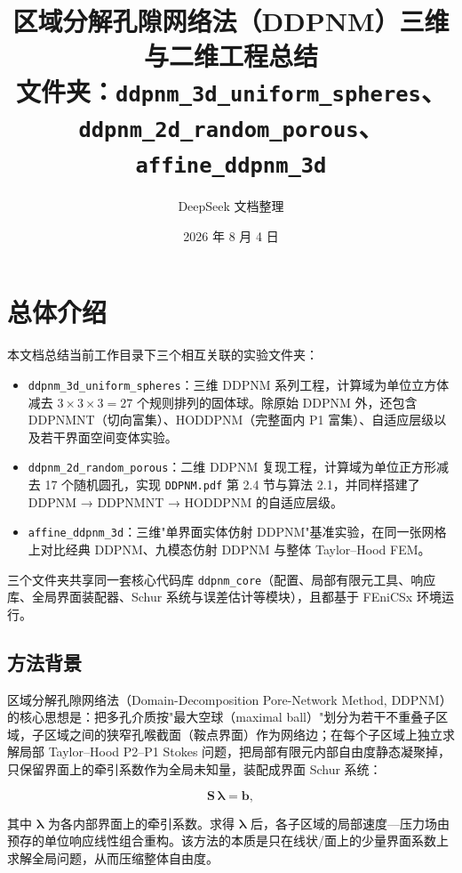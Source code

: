 \documentclass[11pt,a4paper]{ctexart}
\title{\bfseries 区域分解孔隙网络法（DDPNM）三维与二维工程总结\\
\large 文件夹：\texttt{ddpnm\_3d\_uniform\_spheres}、\texttt{ddpnm\_2d\_random\_porous}、\texttt{affine\_ddpnm\_3d}}
\author{DeepSeek 文档整理}
\date{2026 年 8 月 4 日}
\newcommand{\Dd}{DDPNM}
\begin{document}
\maketitle
\thispagestyle{empty}

\tableofcontents
\newpage

\section{总体介绍}
\label{sec:overview}

本文档总结当前工作目录下三个相互关联的实验文件夹：

\begin{itemize}[itemsep=2pt]
  \item \texttt{ddpnm\_3d\_uniform\_spheres}：三维 \Dd{} 系列工程，计算域为单位立方体减去 $3\times3\times3=27$ 个规则排列的固体球。除原始 \Dd{} 外，还包含 \Dd{}NT（切向富集）、HODDPNM（完整面内 P1 富集）、自适应层级以及若干界面空间变体实验。
  \item \texttt{ddpnm\_2d\_random\_porous}：二维 \Dd{} 复现工程，计算域为单位正方形减去 17 个随机圆孔，实现 \texttt{DDPNM.pdf} 第 2.4 节与算法 2.1，并同样搭建了 \Dd{} → \Dd{}NT → HODDPNM 的自适应层级。
  \item \texttt{affine\_ddpnm\_3d}：三维"单界面实体仿射 \Dd{}"基准实验，在同一张网格上对比经典 \Dd{}、九模态仿射 \Dd{} 与整体 Taylor--Hood FEM。
\end{itemize}

三个文件夹共享同一套核心代码库 \texttt{ddpnm\_core}（配置、局部有限元工具、响应库、全局界面装配器、Schur 系统与误差估计等模块），且都基于 FEniCSx 环境运行。

\subsection{方法背景}
\label{sec:method-background}

区域分解孔隙网络法（Domain-Decomposition Pore-Network Method, \Dd{}）的核心思想是：把多孔介质按"最大空球（maximal ball）"划分为若干不重叠子区域，子区域之间的狭窄孔喉截面（鞍点界面）作为网络边；在每个子区域上独立求解局部 Taylor--Hood P2--P1 Stokes 问题，把局部有限元内部自由度静态凝聚掉，只保留界面上的牵引系数作为全局未知量，装配成界面 Schur 系统：

\begin{equation}
  \mathbf{S}\,\boldsymbol{\lambda}=\mathbf{b},
\end{equation}

其中 $\boldsymbol{\lambda}$ 为各内部界面上的牵引系数。求得 $\boldsymbol{\lambda}$ 后，各子区域的局部速度—压力场由预存的单位响应线性组合重构。该方法的本质是只在线状/面上的少量界面系数上求解全局问题，从而压缩整体自由度。
\end{document}
